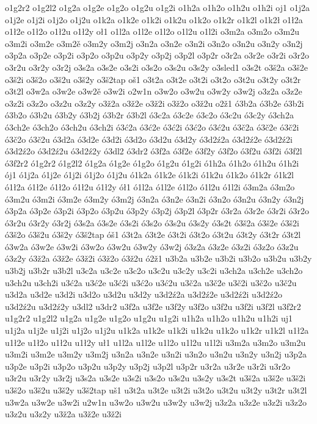 {o1g2r2
o1g2l2
o1g2a
o1g2e
o1g2o
o1g2u
o1g2i
o1h2a
o1h2o
o1h2u
o1h2i
oj1
o1j2a
o1j2e
o1j2i
o1j2o
o1j2u
o1k2a
o1k2e
o1k2i
o1k2u
o1k2o
o1k2r
o1k2l
o1k2ł
o1ł2a
o1ł2e
o1ł2o
o1ł2u
o1ł2y
oł1
o1l2a
o1l2e
o1l2o
o1l2u
o1l2i
o3m2a
o3m2o
o3m2u
o3m2i
o3m2e
o3m2ě
o3m2y
o3m2j
o3n2a
o3n2e
o3n2i
o3n2o
o3n2u
o3n2y
o3n2j
o3p2a
o3p2e
o3p2i
o3p2o
o3p2u
o3p2y
o3p2j
o3p2l
o3p2r
o3r2a
o3r2e
o3r2i
o3r2o
o3r2u
o3r2y
o3r2j
o3s2a
o3s2e
o3s2i
o3s2o
o3s2u
o3s2y
o3sled1
o3s2t
o3š2a
o3š2e
o3š2i
o3š2o
o3š2u
o3š2y
o3š2tap
oš1
o3t2a
o3t2e
o3t2i
o3t2o
o3t2u
o3t2y
o3t2r
o3t2l
o3w2a
o3w2e
o3w2ě
o3w2i
o2w1n
o3w2o
o3w2u
o3w2y
o3w2j
o3z2a
o3z2e
o3z2i
o3z2o
o3z2u
o3z2y
o3ž2a
o3ž2e
o3ž2i
o3ž2o
o3ž2u
o2ž1
ó3b2a
ó3b2e
ó3b2i
ó3b2o
ó3b2u
ó3b2y
ó3b2j
ó3b2r
ó3b2l
ó3c2a
ó3c2e
ó3c2o
ó3c2u
ó3c2y
ó3ch2a
ó3ch2e
ó3ch2o
ó3ch2u
ó3ch2i
ó3ć2a
ó3ć2e
ó3ć2i
ó3ć2o
ó3ć2u
ó3č2a
ó3č2e
ó3č2i
ó3č2o
ó3č2u
ó3d2a
ó3d2e
ó3d2i
ó3d2o
ó3d2u
ó3d2y
ó3d2ź2a
ó3d2ź2e
ó3d2ź2i
ó3d2ź2o
ó3d2ź2u
ó3d2ź2y
ó3dl2
ó3dr2
ó3f2a
ó3f2e
ó3f2y
ó3f2o
ó3f2u
ó3f2i
ó3f2l
ó3f2r2
ó1g2r2
ó1g2l2
ó1g2a
ó1g2e
ó1g2o
ó1g2u
ó1g2i
ó1h2a
ó1h2o
ó1h2u
ó1h2i
ój1
ó1j2a
ó1j2e
ó1j2i
ó1j2o
ó1j2u
ó1k2a
ó1k2e
ó1k2i
ó1k2u
ó1k2o
ó1k2r
ó1k2l
ó1ł2a
ó1ł2e
ó1ł2o
ó1ł2u
ó1ł2y
ół1
ó1l2a
ó1l2e
ó1l2o
ó1l2u
ó1l2i
ó3m2a
ó3m2o
ó3m2u
ó3m2i
ó3m2e
ó3m2y
ó3m2j
ó3n2a
ó3n2e
ó3n2i
ó3n2o
ó3n2u
ó3n2y
ó3n2j
ó3p2a
ó3p2e
ó3p2i
ó3p2o
ó3p2u
ó3p2y
ó3p2j
ó3p2l
ó3p2r
ó3r2a
ó3r2e
ó3r2i
ó3r2o
ó3r2u
ó3r2y
ó3r2j
ó3s2a
ó3s2e
ó3s2i
ó3s2o
ó3s2u
ó3s2y
ó3s2t
ó3š2a
ó3š2e
ó3š2i
ó3š2o
ó3š2u
ó3š2y
ó3š2tap
óš1
ó3t2a
ó3t2e
ó3t2i
ó3t2o
ó3t2u
ó3t2y
ó3t2r
ó3t2l
ó3w2a
ó3w2e
ó3w2i
ó3w2o
ó3w2u
ó3w2y
ó3w2j
ó3z2a
ó3z2e
ó3z2i
ó3z2o
ó3z2u
ó3z2y
ó3ž2a
ó3ž2e
ó3ž2i
ó3ž2o
ó3ž2u
ó2ž1
u3b2a
u3b2e
u3b2i
u3b2o
u3b2u
u3b2y
u3b2j
u3b2r
u3b2l
u3c2a
u3c2e
u3c2o
u3c2u
u3c2y
u3c2i
u3ch2a
u3ch2e
u3ch2o
u3ch2u
u3ch2i
u3ć2a
u3ć2e
u3ć2i
u3ć2o
u3ć2u
u3č2a
u3č2e
u3č2i
u3č2o
u3č2u
u3d2a
u3d2e
u3d2i
u3d2o
u3d2u
u3d2y
u3d2ź2a
u3d2ź2e
u3d2ź2i
u3d2ź2o
u3d2ź2u
u3d2ź2y
u3dl2
u3dr2
u3f2a
u3f2e
u3f2y
u3f2o
u3f2u
u3f2i
u3f2l
u3f2r2
u1g2r2
u1g2l2
u1g2a
u1g2e
u1g2o
u1g2u
u1g2i
u1h2a
u1h2o
u1h2u
u1h2i
uj1
u1j2a
u1j2e
u1j2i
u1j2o
u1j2u
u1k2a
u1k2e
u1k2i
u1k2u
u1k2o
u1k2r
u1k2l
u1ł2a
u1ł2e
u1ł2o
u1ł2u
u1ł2y
uł1
u1l2a
u1l2e
u1l2o
u1l2u
u1l2i
u3m2a
u3m2o
u3m2u
u3m2i
u3m2e
u3m2y
u3m2j
u3n2a
u3n2e
u3n2i
u3n2o
u3n2u
u3n2y
u3n2j
u3p2a
u3p2e
u3p2i
u3p2o
u3p2u
u3p2y
u3p2j
u3p2l
u3p2r
u3r2a
u3r2e
u3r2i
u3r2o
u3r2u
u3r2y
u3r2j
u3s2a
u3s2e
u3s2i
u3s2o
u3s2u
u3s2y
u3s2t
u3š2a
u3š2e
u3š2i
u3š2o
u3š2u
u3š2y
u3š2tap
uš1
u3t2a
u3t2e
u3t2i
u3t2o
u3t2u
u3t2y
u3t2r
u3t2l
u3w2a
u3w2e
u3w2i
u2w1n
u3w2o
u3w2u
u3w2y
u3w2j
u3z2a
u3z2e
u3z2i
u3z2o
u3z2u
u3z2y
u3ž2a
u3ž2e
u3ž2i
}

